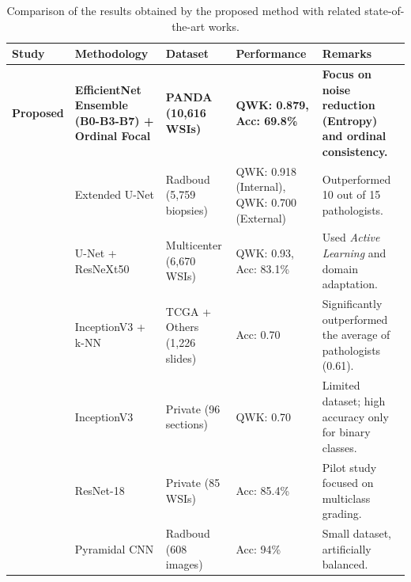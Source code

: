 \begin{table}[H]
	\centering
	\footnotesize %
	\begin{tabular}{@{}lp{2.8cm}p{2cm}p{2cm}p{3cm}@{}}
		\toprule
		\textbf{Study} & \textbf{Methodology} & \textbf{Dataset} & \textbf{Performance} & \textbf{Remarks} \\
		\midrule
		
		\textbf{Proposed} & \textbf{EfficientNet Ensemble (B0-B3-B7) + Ordinal Focal} & \textbf{PANDA (10,616 WSIs)} & \textbf{QWK: 0.879, Acc: 69.8\%} & \textbf{Focus on noise reduction (Entropy) and ordinal consistency.} \\
		\midrule
		
		\cite{ref-bulten2020} & Extended U-Net & Radboud (5,759 biopsies) & QWK: 0.918 (Internal), QWK: 0.700 (External) & Outperformed 10 out of 15 pathologists. \\
		\midrule
		
		\cite{ref-singhal2022} & U-Net + ResNeXt50 & Multicenter (6,670 WSIs) & QWK: 0.93, Acc: 83.1\% & Used \textit{Active Learning} and domain adaptation. \\
		\midrule
		
		\cite{ref-nagpal2019} & InceptionV3 + k-NN & TCGA + Others (1,226 slides) & Acc: 0.70 & Significantly outperformed the average of pathologists (0.61). \\
		\midrule
		
		\cite{ref-lucas2019} & InceptionV3 & Private (96 sections) & QWK: 0.70 & Limited dataset; high accuracy only for binary classes. \\
		\midrule
		
		\cite{ref-kott2019} & ResNet-18 & Private (85 WSIs) & Acc: 85.4\% & Pilot study focused on multiclass grading. \\
		\midrule
		
		\cite{ref-hammouda2021} & Pyramidal CNN & Radboud (608 images) & Acc: 94\% & Small dataset, artificially balanced. \\
		\bottomrule
	\end{tabular}
	\caption{Comparison of the results obtained by the proposed method with related state-of-the-art works.}	
	\label{tab:comparison-results}
\end{table}